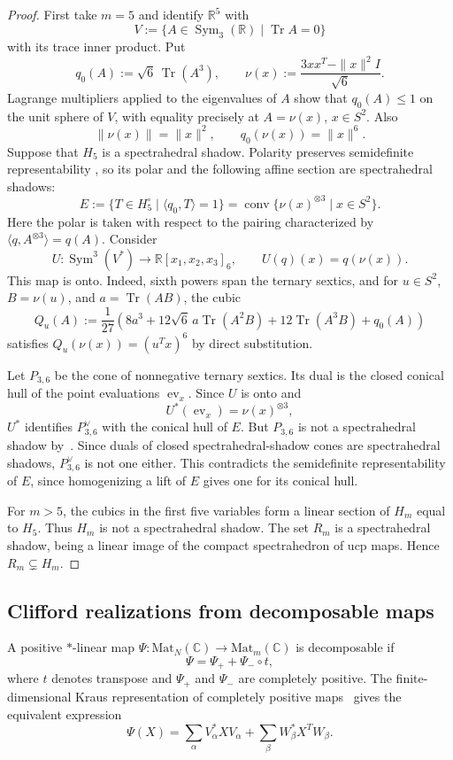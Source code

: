 \documentclass[11pt,onecolumn]{article}
\theoremstyle{blueplain}
\theoremstyle{bluedefinition}
\theoremstyle{bluedefinition}
\newcommand{\R}{\mathbb R}
\newcommand{\C}{\mathbb C}
\newcommand{\M}{\mathrm{Mat}}
\newcommand{\Sym}{\operatorname{Sym}}
\newcommand{\Tr}{\operatorname{Tr}}
\begin{document}
\begin{proof}
First take $m=5$ and identify $\R^5$ with
\[
V:=\{A\in\Sym_3(\R)\mid\Tr A=0\}
\]
with its trace inner product. Put
\[
q_0(A):=\sqrt6\,\Tr(A^3),
\qquad
\nu(x):=\frac{3xx^T-\|x\|^2I}{\sqrt6}.
\]
Lagrange multipliers applied to the eigenvalues of $A$ show that
$q_0(A)\leqslant1$ on the unit sphere of $V$, with equality precisely at
$A=\nu(x)$, $x\in S^2$. Also
\[
\|\nu(x)\|=\|x\|^2,
\qquad q_0(\nu(x))=\|x\|^6.
\]
Suppose that $H_5$ is a spectrahedral shadow.  Polarity preserves
semidefinite representability
\cite{GouveiaNetzer}, so its polar and the following affine
section are spectrahedral shadows:
\[
E:=\{T\in H_5^\circ\mid\langle q_0,T\rangle=1\}
=\operatorname{conv}\{\nu(x)^{\otimes3}\mid x\in S^2\}.
\]
Here the polar is taken with respect to the pairing characterized
by $\langle q,A^{\otimes3}\rangle=q(A)$. Consider
\[
U\colon\operatorname{Sym}^3(V^*)\to\R[x_1,x_2,x_3]_6,
\qquad U(q)(x)=q(\nu(x)).
\]
This map is onto. Indeed, sixth powers span the ternary sextics, and for
$u\in S^2$, $B=\nu(u)$, and $a=\Tr(AB)$, the cubic
\[
Q_u(A):=\frac1{27}\left(
8a^3+12\sqrt6\,a\Tr(A^2B)+12\Tr(A^3B)+q_0(A)
\right)
\]
satisfies $Q_u(\nu(x))=(u^Tx)^6$ by direct substitution.

Let $P_{3,6}$ be the cone of nonnegative ternary sextics. Its dual is the
closed conical hull of the point evaluations $\operatorname{ev}_x$. Since
$U$ is onto and
\[
U^*(\operatorname{ev}_x)=\nu(x)^{\otimes3},
\]
$U^*$ identifies $P_{3,6}^{\vee}$ with the conical hull of $E$. But
$P_{3,6}$ is not a spectrahedral shadow
by~\cite{Scheiderer}. Since duals of closed
spectrahedral-shadow cones are spectrahedral shadows, $P_{3,6}^{\vee}$ is not
one either. This contradicts the semidefinite representability of $E$, since
homogenizing a lift of $E$ gives one for its conical hull.

For $m>5$, the cubics in the first five variables form a linear section of
$H_m$ equal to $H_5$. Thus $H_m$ is not a spectrahedral shadow. The set
$R_m$ is a spectrahedral shadow, being a linear image of the
compact spectrahedron of ucp maps. Hence
$R_m\subsetneq H_m$.
\end{proof}

\subsection{Clifford realizations from decomposable maps}

A positive $*$-linear map $\Psi\colon \M_N(\C)\to \M_m(\C)$ is decomposable if
\[
\Psi=\Psi_++\Psi_-\circ t,
\]
where $t$ denotes transpose and $\Psi_+$ and $\Psi_-$ are completely
positive.  The finite-dimensional Kraus representation of
completely positive maps~\cite{Choi} gives the equivalent expression
\begin{equation}\label{eq:decomposable-kraus}
\Psi(X)=\sum_\alpha V_\alpha^*XV_\alpha
+\sum_\beta W_\beta^*X^TW_\beta.
\end{equation}
\end{document}
